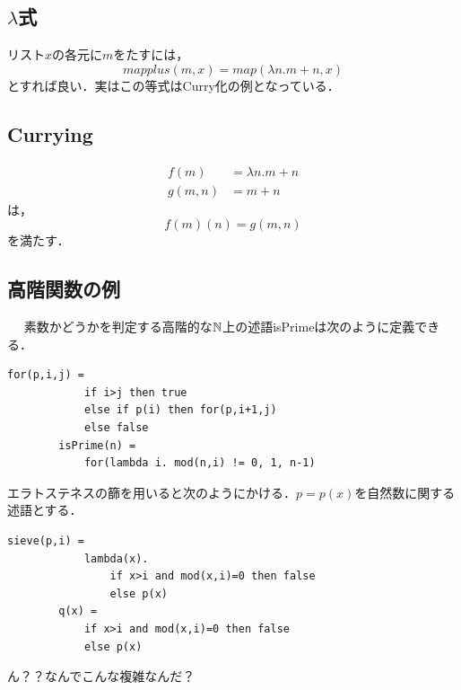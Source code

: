 \documentclass[uplatex, dvipdfmx]{jsreport}
\begin{document}
\subsection{$\lambda$式}

\begin{example}
    リスト$x$の各元に$m$をたすには，
    \[ mapplus(m,x) = map(\lambda n.m+n,x) \]
    とすれば良い．実はこの等式はCurry化の例となっている．
\end{example}

\subsection{Currying}

\begin{definition}[Currying]
\begin{align*}
    f(m) &= \lambda n.m+n\\
    g(m,n) &= m+n
\end{align*}
は，
\[ f(m)(n) = g(m,n) \]
を満たす．
\end{definition}

\subsection{高階関数の例}

\begin{example}　
    素数かどうかを判定する高階的な$\mathbb{N}$上の述語isPrimeは次のように定義できる．
    \begin{lstlisting}[caption=isPrime]
        for(p,i,j) =
            if i>j then true
            else if p(i) then for(p,i+1,j)
            else false
        isPrime(n) =
            for(lambda i. mod(n,i) != 0, 1, n-1)
    \end{lstlisting}
    エラトステネスの篩を用いると次のようにかける．$p=p(x)$を自然数に関する述語とする．
    \begin{lstlisting}[caption=Sieve of Eratosthenes]
        sieve(p,i) =
            lambda(x).
                if x>i and mod(x,i)=0 then false
                else p(x)
        q(x) =
            if x>i and mod(x,i)=0 then false
            else p(x)
    \end{lstlisting}
    ん？？なんでこんな複雑なんだ？
\end{example}

\begin{example}[行列]
    
\end{example}
\end{document}
